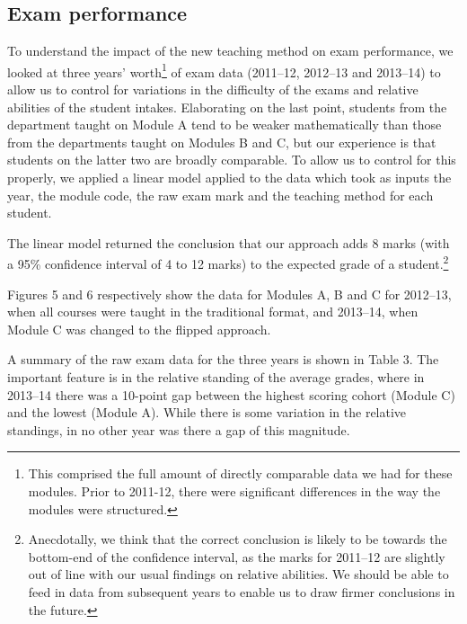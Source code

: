 \documentclass{amsart}
\begin{document}
\subsection{Exam performance}

To understand the impact of the new teaching method on exam performance, we looked at three years' worth\footnote{This comprised the full amount of directly comparable data we had for these modules. Prior to 2011-12, there were significant differences in the way the modules were structured.} of exam data (2011--12, 2012--13 and 2013--14) to allow us to control for variations in the difficulty of the exams and relative abilities of the student intakes.  Elaborating on the last point, students from the department taught on Module A tend to be weaker mathematically than those from the departments taught on Modules B and C, but our experience is that students on the latter two are broadly comparable.  To allow us to control for this properly, we applied a linear model applied to the data which took as inputs the year, the module code, the raw exam mark and the teaching method for each student.

The linear model returned the conclusion that our approach adds 8 marks (with a 95\% confidence interval of 4 to 12 marks) to the expected grade of a student.\footnote{Anecdotally, we think that the correct conclusion is likely to be towards the bottom-end of the confidence interval, as the marks for 2011--12 are slightly out of line with our usual findings on relative abilities.  We should be able to feed in data from subsequent years to enable us to draw firmer conclusions in the future.}

Figures 5 and 6 respectively show the data for Modules A, B and C for 2012--13, when all courses were taught in the traditional format, and 2013--14, when Module C was changed to the flipped approach.

A summary of the raw exam data for the three years is shown in Table 3.  The important feature is in the relative standing of the average grades, where in 2013--14 there was a 10-point gap between the highest scoring cohort (Module C) and the lowest (Module A).  While there is some variation in the relative standings, in no other year was there a gap of this magnitude.
\end{document}

